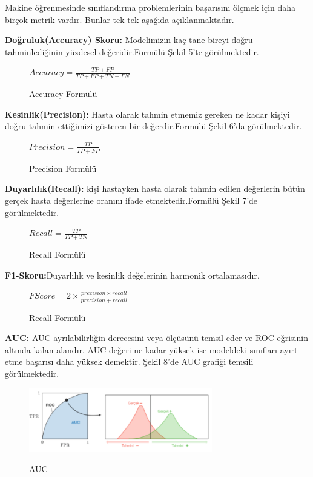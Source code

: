 \documentclass[conference]{IEEEtran}
\begin{document}
Makine öğrenmesinde sınıflandırma problemlerinin başarısını ölçmek için daha birçok metrik vardır. Bunlar tek tek aşağıda açıklanmaktadır.

\textbf{Doğruluk(Accuracy) Skoru:} Modelimizin kaç tane bireyi doğru tahminlediğinin yüzdesel değeridir.Formülü Şekil 5'te görülmektedir.

\begin{figure}[htbp]
    \centering
   	 \Large $Accuracy=\tfrac{TP+FP}{TP+FP+TN+FN}$
	\caption{Accuracy Formülü}
    \label{fig}
\end{figure}

\textbf{Kesinlik(Precision):} Hasta olarak tahmin etmemiz gereken ne kadar kişiyi doğru tahmin ettiğimizi gösteren bir değerdir.Formülü Şekil 6'da görülmektedir.
\begin{figure}[htbp]
    \centering
   	 \Large $Precision=\tfrac{TP} {TP+FP}$
	\caption{Precision Formülü}
    \label{fig}
\end{figure}

\textbf{Duyarlılık(Recall):} kişi hastayken hasta olarak tahmin edilen değerlerin bütün gerçek hasta değerlerine oranını ifade etmektedir.Formülü Şekil 7'de görülmektedir.
\begin{figure}[htbp]
    \centering
   	 \Large $Recall=\tfrac{TP} {TP+TN}$
	\caption{Recall Formülü}
    \label{fig}
\end{figure}

\textbf{F1-Skoru:}Duyarlılık ve kesinlik değelerinin harmonik ortalamasıdır.
\begin{figure}[htbp]
    \centering
   	 \Large $F Score=2\times\tfrac{precision \times recall}{precision+recall}$
	\caption{Recall Formülü}
    \label{fig}
\end{figure}

\textbf{AUC:} AUC ayrılabilirliğin derecesini veya ölçüsünü temsil eder ve ROC eğrisinin altında kalan alandır\cite{auc}. AUC değeri ne kadar yüksek ise modeldeki sınıfları ayırt etme başarısı daha yüksek demektir. Şekil 8'de AUC grafiği temsili görülmektedir.
\begin{figure}[htbp]
    \centering
   	\includegraphics[width=8cm]{images/aucresim.PNG}\\
	\caption{AUC\cite{auc}}
    \label{fig}
\end{figure}
\end{document}

